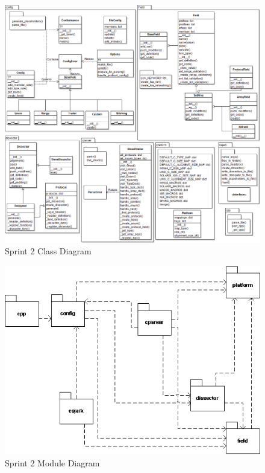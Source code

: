 \begin{figure}[ht]
	\center
	\includegraphics[width=\textwidth]{./sprints/img/ClassDiagramSprint4v2.png}
	\caption{Sprint 2 Class Diagram \label{fig:sp2class}}
\end{figure}

\begin{figure}[ht]
	\center
	\includegraphics[width=\textwidth]{./sprints/img/sp4modulediagram.png}
	\caption{Sprint 2 Module Diagram \label{fig:sp2module}}
\end{figure}

